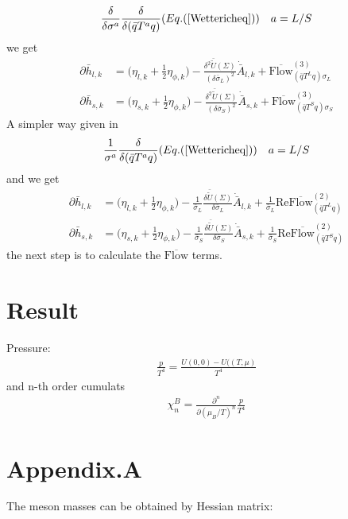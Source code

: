 \documentclass[12pt]{article}
\begin{document}
\begin{align}
\frac{{\delta}}{\delta \sigma^a}\frac{{\delta}}{\delta(\bar q T^a q)}(Eq. (\ref{Wettericheq})) \quad a=L/S
\end{align}
we get
\begin{align}
\partial \bar h_{l,k}&=\bigg( \eta_{l,k} +\frac{1}{2}\eta_{\phi,k}\bigg )-\frac{\delta^2 \bar {\tilde U}(\Sigma)}{(\delta \bar \sigma_L)^2}\dot{\bar A}_{l,k}+\overline{  \text{Flow} }_{(\bar q T^L q) \sigma_L}^{(3)}\\
\partial \bar h_{s,k}&=\bigg( \eta_{s,k} +\frac{1}{2}\eta_{\phi,k}\bigg )-\frac{\delta^2 \bar {\tilde U}(\Sigma)}{(\delta \bar \sigma_S)^2}\dot{\bar A}_{s,k}+\overline{  \text{Flow} }_{(\bar q T^S q) \sigma_S}^{(3)}
\end{align}
A simpler way given in \cite{}
\begin{align}
\frac{{1}}{\sigma^a}\frac{{\delta}}{\delta(\bar q T^a q)}(Eq. (\ref{Wettericheq})) \quad a=L/S
\end{align}
and we get
\begin{align}
\partial \bar h_{l,k}&=\bigg( \eta_{l,k} +\frac{1}{2}\eta_{\phi,k}\bigg )-\frac{1}{\bar \sigma_L} \frac{\delta \bar{\tilde U}(\Sigma)}{\delta \bar \sigma_L}\dot{\bar A}_{l,k}+\frac{1}{\bar \sigma_L} \text{Re} \overline{  \text{Flow} }_{(\bar q T^L q)}^{(2)}\\
\partial \bar h_{s,k}&=\bigg( \eta_{s,k} +\frac{1}{2}\eta_{\phi,k}\bigg )-\frac{1}{\bar \sigma_S} \frac{\delta \bar{\tilde U}(\Sigma)}{\delta \bar \sigma_S}\dot{\bar A}_{s,k}+\frac{1}{\bar \sigma_S} \text{Re} \overline{  \text{Flow} }_{(\bar q T^S q)}^{(2)} \label{Yukawa_eq}
\end{align}
the next step is to calculate the $\overline{\text{Flow}}$ terms.

\section{Result}
Pressure:
\begin{align}
\frac{p}{T^4}=\frac{U(0,0)-U((T,\mu)}{T^4}
\end{align}
and  n-th order cumulats
\begin{align}
\chi^B_n=\frac{\partial^n}{\partial (\mu_B/T)^n}\frac{p}{T^4}
\end{align}

\section{Appendix.A}
The meson masses can be obtained by Hessian matrix:
\end{document}
